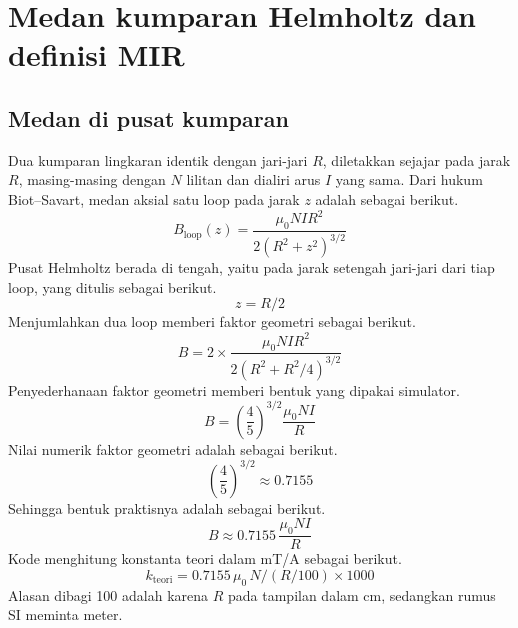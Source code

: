 \documentclass[a4paper,11pt]{article}
\begin{document}
\section{Medan kumparan Helmholtz dan definisi MIR}
\subsection{Medan di pusat kumparan}
Dua kumparan lingkaran identik dengan jari-jari $R$,
diletakkan sejajar pada jarak $R$,
masing-masing dengan $N$ lilitan dan dialiri arus $I$ yang sama.
Dari hukum Biot--Savart, medan aksial satu loop pada jarak $z$ adalah
sebagai berikut.
\begin{equation*}
B_{\mathrm{loop}}(z) = \frac{\mu_{0}NI R^{2}}{2\left(R^{2}+z^{2}\right)^{3/2}}
\end{equation*}
Pusat Helmholtz berada di tengah, yaitu pada jarak setengah jari-jari
dari tiap loop, yang ditulis sebagai berikut.
\begin{equation*}
z = R/2
\end{equation*}
Menjumlahkan dua loop memberi faktor geometri sebagai berikut.
\begin{equation*}
B = 2\times \frac{\mu_{0}NI R^{2}}{2\left(R^{2}+R^{2}/4\right)^{3/2}}
\end{equation*}
Penyederhanaan faktor geometri memberi bentuk yang dipakai simulator.
\begin{equation}
B = \left(\frac{4}{5}\right)^{3/2}\frac{\mu_{0}NI}{R}
\label{eq:1}
\end{equation}
Nilai numerik faktor geometri adalah sebagai berikut.
\begin{equation*}
\left(\frac{4}{5}\right)^{3/2} \approx 0.7155
\end{equation*}
Sehingga bentuk praktisnya adalah sebagai berikut.
\begin{equation*}
B \approx 0.7155\,\frac{\mu_{0}NI}{R}
\end{equation*}
Kode menghitung konstanta teori dalam mT/A sebagai berikut.
\begin{equation*}
k_{\mathrm{teori}} = 0.7155\,\mu_{0}\,N/(R/100)\times 1000
\end{equation*}
Alasan dibagi 100 adalah karena $R$ pada tampilan dalam cm,
sedangkan rumus SI meminta meter.
\end{document}
